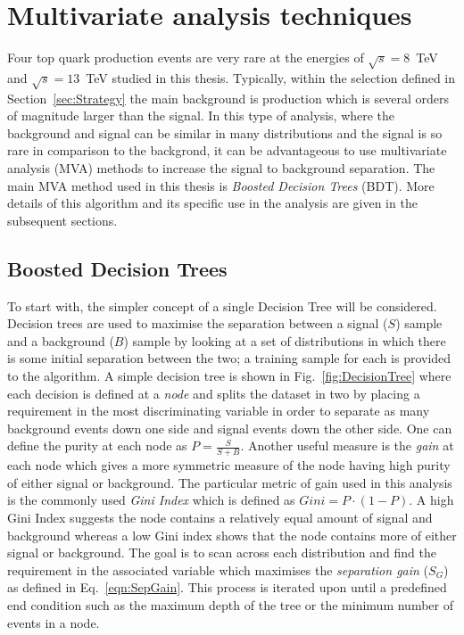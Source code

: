 \section{Multivariate analysis techniques ~\label{sec:MVAtechniques}}

Four top quark production events are very rare at the energies of $\sqrt{s} = 8$~TeV and $\sqrt{s} = 13$~TeV studied in this thesis. Typically, within the selection defined in Section~\ref{sec:Strategy} the main background is \ttbar production which is several orders of magnitude larger than the \tttt signal. In this type of analysis, where the background and signal can be similar in many distributions and the signal is so rare in comparison to the backgrond, it can be advantageous to use multivariate analysis (MVA) methods to increase the signal to background separation. The main MVA method used in this thesis is \emph{Boosted Decision Trees} (BDT). More details of this algorithm and its specific use in the analysis are given in the subsequent sections.


\subsection{Boosted Decision Trees}
\label{sec:BDT}

To start with, the simpler concept of a single Decision Tree will be considered. Decision trees are used to maximise the separation between a signal ($S$) sample and a background ($B$) sample by looking at a set of distributions in which there is some initial separation between the two; a training sample for each is provided to the algorithm. A simple decision tree is shown in Fig.~\ref{fig:DecisionTree} where each decision is defined at a \emph{node} and splits the dataset in two by placing a requirement in the most discriminating variable in order to separate as many background events down one side and signal events down the other side.
One can define the purity at each node as $P=\frac{S}{S+B}$. Another useful measure is the \emph{gain} at each node which gives a more symmetric measure of the node having high purity of either signal or background. The particular metric of gain used in this analysis is the commonly used \emph{Gini Index} which is defined as $Gini = P\cdot\left(1-P\right)$. A high Gini Index suggests the node contains a relatively equal amount of signal and background whereas a low Gini index shows that the node contains more of either signal or background. 
The goal is to scan across each distribution and find the requirement in the associated variable which maximises the \emph{separation gain} ($S_{G}$) as defined in Eq.~\ref{eqn:SepGain}. This process is iterated upon until a predefined end condition such as the maximum depth of the tree or the minimum number of events in a node.


